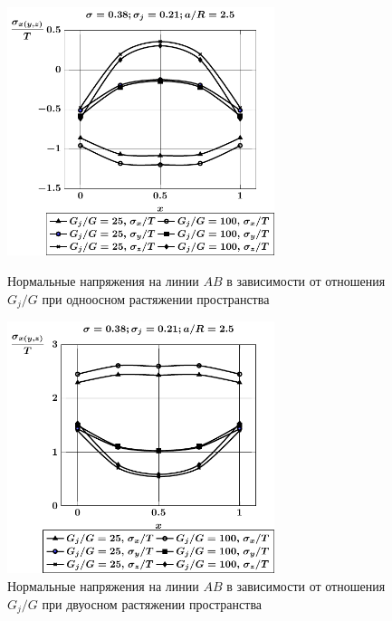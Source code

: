 \begin{figure}[h!]
\centering\footnotesize
\parbox[b]{7.5cm}{\centering\includegraphics[width=7.8cm]{inc13-g-a25-d95-t1-ab.pdf}
\caption{Нормальные напряжения на линии  $AB$ в зависимости от отношения $G_j/G$ при одноосном растяжении пространства
\label{f:8:84}}}\hfil\hfil
\parbox[b]{7.5cm}{\centering\includegraphics[width=7.8cm]{inc13-g-a25-d95-t2-ab.pdf}
\caption{Нормальные напряжения на линии  $AB$ в зависимости от отношения $G_j/G$ при двуосном растяжении пространства
\label{f:8:85}}}
\end{figure}


